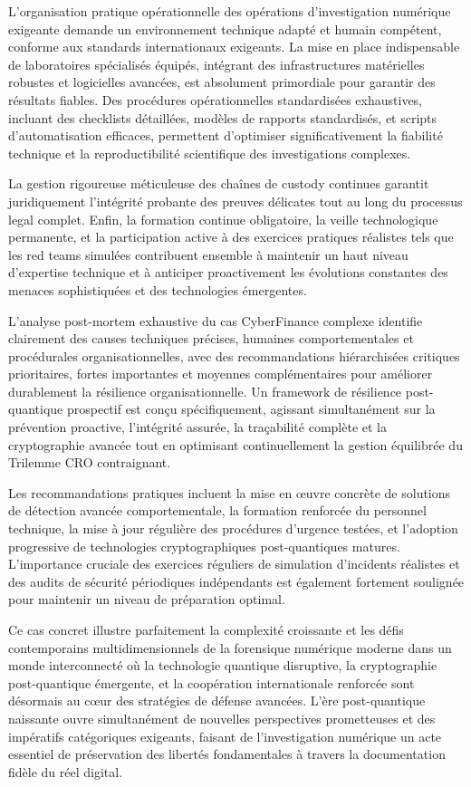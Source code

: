 \documentclass[12pt, a4paper]{article}
\begin{document}
	\medskip
	L'organisation pratique opérationnelle des opérations d'investigation numérique exigeante demande un environnement technique adapté et humain compétent, conforme aux standards internationaux exigeants. La mise en place indispensable de laboratoires spécialisés équipés, intégrant des infrastructures matérielles robustes et logicielles avancées, est absolument primordiale pour garantir des résultats fiables. Des procédures opérationnelles standardisées exhaustives, incluant des checklists détaillées, modèles de rapports standardisés, et scripts d'automatisation efficaces, permettent d'optimiser significativement la fiabilité technique et la reproductibilité scientifique des investigations complexes.
	
	La gestion rigoureuse méticuleuse des chaînes de custody continues garantit juridiquement l'intégrité probante des preuves délicates tout au long du processus legal complet. Enfin, la formation continue obligatoire, la veille technologique permanente, et la participation active à des exercices pratiques réalistes tels que les red teams simulées contribuent ensemble à maintenir un haut niveau d'expertise technique et à anticiper proactivement les évolutions constantes des menaces sophistiquées et des technologies émergentes.
	
	\medskip
	L'analyse post-mortem exhaustive du cas CyberFinance complexe identifie clairement des causes techniques précises, humaines comportementales et procédurales organisationnelles, avec des recommandations hiérarchisées critiques prioritaires, fortes importantes et moyennes complémentaires pour améliorer durablement la résilience organisationnelle. Un framework de résilience post-quantique prospectif est conçu spécifiquement, agissant simultanément sur la prévention proactive, l'intégrité assurée, la traçabilité complète et la cryptographie avancée tout en optimisant continuellement la gestion équilibrée du Trilemme CRO contraignant.
	
	Les recommandations pratiques incluent la mise en œuvre concrète de solutions de détection avancée comportementale, la formation renforcée du personnel technique, la mise à jour régulière des procédures d'urgence testées, et l'adoption progressive de technologies cryptographiques post-quantiques matures. L'importance cruciale des exercices réguliers de simulation d'incidents réalistes et des audits de sécurité périodiques indépendants est également fortement soulignée pour maintenir un niveau de préparation optimal.
	
	\medskip
	Ce cas concret illustre parfaitement la complexité croissante et les défis contemporains multidimensionnels de la forensique numérique moderne dans un monde interconnecté où la technologie quantique disruptive, la cryptographie post-quantique émergente, et la coopération internationale renforcée sont désormais au cœur des stratégies de défense avancées. L'ère post-quantique naissante ouvre simultanément de nouvelles perspectives prometteuses et des impératifs catégoriques exigeants, faisant de l'investigation numérique un acte essentiel de préservation des libertés fondamentales à travers la documentation fidèle du réel digital.
	
\end{document}
